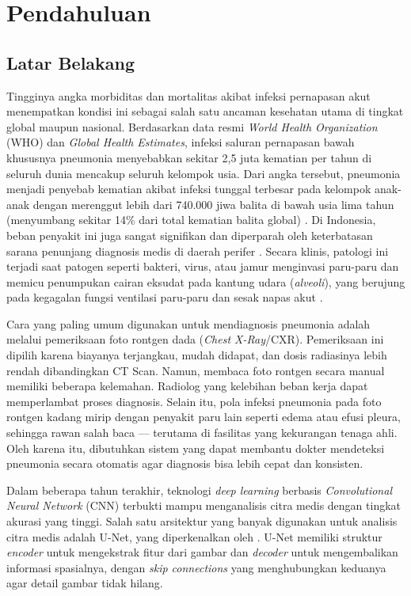 \documentclass[12pt,a4paper,oneside]{book}
\begin{document}
\pagestyle{body}
\pagestyle{body}
\chapter[PENDAHULUAN]{Pendahuluan}

\section{Latar Belakang}

Tingginya angka morbiditas dan mortalitas akibat infeksi pernapasan akut menempatkan kondisi ini sebagai salah satu ancaman kesehatan utama di tingkat global maupun nasional. Berdasarkan data resmi \textit{World Health Organization} (WHO) dan \textit{Global Health Estimates}, infeksi saluran pernapasan bawah khususnya pneumonia menyebabkan sekitar 2,5 juta kematian per tahun di seluruh dunia mencakup seluruh kelompok usia. Dari angka tersebut, pneumonia menjadi penyebab kematian akibat infeksi tunggal terbesar pada kelompok anak-anak dengan merenggut lebih dari 740.000 jiwa balita di bawah usia lima tahun (menyumbang sekitar 14\% dari total kematian balita global) \parencite{who2024}. Di Indonesia, beban penyakit ini juga sangat signifikan dan diperparah oleh keterbatasan sarana penunjang diagnosis medis di daerah perifer \parencite{said2018}. Secara klinis, patologi ini terjadi saat patogen seperti bakteri, virus, atau jamur menginvasi paru-paru dan memicu penumpukan cairan eksudat pada kantung udara (\textit{alveoli}), yang berujung pada kegagalan fungsi ventilasi paru-paru dan sesak napas akut \parencite{seth2022}.

Cara yang paling umum digunakan untuk mendiagnosis pneumonia adalah melalui pemeriksaan foto rontgen dada (\textit{Chest X-Ray}/CXR). Pemeriksaan ini dipilih karena biayanya terjangkau, mudah didapat, dan dosis radiasinya lebih rendah dibandingkan CT Scan. Namun, membaca foto rontgen secara manual memiliki beberapa kelemahan. Radiolog yang kelebihan beban kerja dapat memperlambat proses diagnosis. Selain itu, pola infeksi pneumonia pada foto rontgen kadang mirip dengan penyakit paru lain seperti edema atau efusi pleura, sehingga rawan salah baca — terutama di fasilitas yang kekurangan tenaga ahli. Oleh karena itu, dibutuhkan sistem yang dapat membantu dokter mendeteksi pneumonia secara otomatis agar diagnosis bisa lebih cepat dan konsisten.

Dalam beberapa tahun terakhir, teknologi \textit{deep learning} berbasis \textit{Convolutional Neural Network} (CNN) terbukti mampu menganalisis citra medis dengan tingkat akurasi yang tinggi. Salah satu arsitektur yang banyak digunakan untuk analisis citra medis adalah U-Net, yang diperkenalkan oleh \textcite{ronneberger2015unet}. U-Net memiliki struktur \textit{encoder} untuk mengekstrak fitur dari gambar dan \textit{decoder} untuk mengembalikan informasi spasialnya, dengan \textit{skip connections} yang menghubungkan keduanya agar detail gambar tidak hilang.
\end{document}
